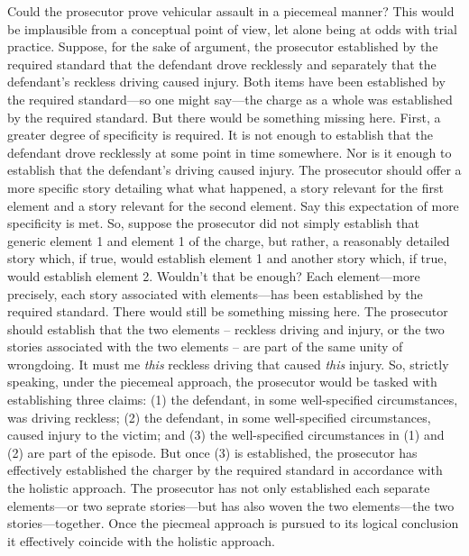 \documentclass[
  10pt,
  dvipsnames,enabledeprecatedfontcommands]{scrartcl}
\begin{document}
Could the prosecutor prove vehicular assault in a piecemeal manner? This
would be implausible from a conceptual point of view, let alone being at
odds with trial practice. Suppose, for the sake of argument, the
prosecutor established by the required standard that the defendant drove
recklessly and separately that the defendant's reckless driving caused
injury. Both items have been established by the required standard---so
one might say---the charge as a whole was established by the required
standard. But there would be something missing here. First, a greater
degree of specificity is required. It is not enough to establish that
the defendant drove recklessly at some point in time somewhere. Nor is
it enough to establish that the defendant's driving caused injury. The
prosecutor should offer a more specific story detailing what what
happened, a story relevant for the first element and a story relevant
for the second element. Say this expectation of more specificity is met.
So, suppose the prosecutor did not simply establish that generic element
1 and element 1 of the charge, but rather, a reasonably detailed story
which, if true, would establish element 1 and another story which, if
true, would establish element 2. Wouldn't that be enough? Each
element---more precisely, each story associated with elements---has been
established by the required standard. There would still be something
missing here. The prosecutor should establish that the two elements --
reckless driving and injury, or the two stories associated with the two
elements -- are part of the same unity of wrongdoing. It must me
\emph{this} reckless driving that caused \emph{this} injury. So,
strictly speaking, under the piecemeal approach, the prosecutor would be
tasked with establishing three claims: (1) the defendant, in some
well-specified circumstances, was driving reckless; (2) the defendant,
in some well-specified circumstances, caused injury to the victim; and
(3) the well-specified circumstances in (1) and (2) are part of the
episode. But once (3) is established, the prosecutor has effectively
established the charger by the required standard in accordance with the
holistic approach. The prosecutor has not only established each separate
elements---or two seprate stories---but has also woven the two
elements---the two stories---together. Once the piecmeal approach is
pursued to its logical conclusion it effectively coincide with the
holistic approach.
\end{document}
